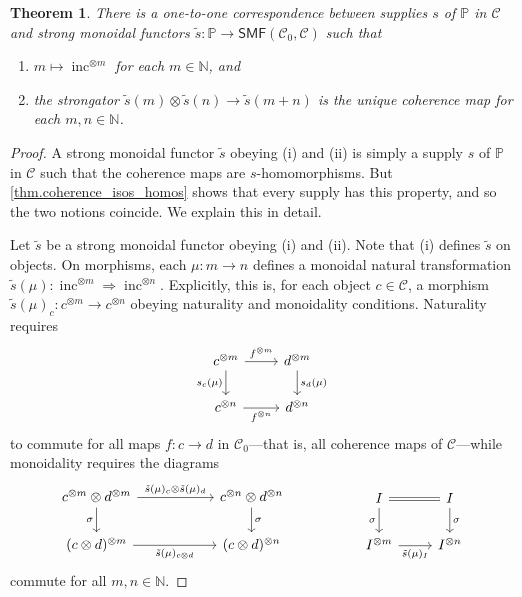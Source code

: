 \documentclass[11pt, oneside, article]{memoir}
\theoremstyle{plain}
\newtheorem{theorem}{Theorem}[chapter]
\theoremstyle{definition}
\theoremstyle{remark}
\newcommand{\cat}[1]{\mathcal{#1}}%
\newcommand{\Cat}[1]{{\mathsf{#1}}}%
\DeclareMathOperator{\inc}{inc}
\newcommand{\tpow}[1]{^{\otimes #1}}
\newcommand{\smf}{\Cat{SMF}}
\newcommand{\nn}{\mathbb{N}}
\newcommand{\pp}{\mathbb{P}}
\newcommand{\mob}[1]{#1_0}
\begin{document}
\begin{theorem}\label{thm.supply_v2}
There is a one-to-one correspondence between supplies $s$ of $\pp$ in $\cat{C}$ and strong monoidal functors $\tilde{s}\colon\pp\to\smf(\mob{\cat{C}},\cat{C})$ such that 
\begin{enumerate}[label=(\roman*)]
	\item $m\mapsto\inc\tpow{m}$ for each $m\in\nn$, and
	\item the strongator $\tilde{s}(m)\otimes \tilde{s}(n)\to \tilde{s}(m+n)$ is the unique coherence map for each $m,n \in \nn$.
\end{enumerate}
\end{theorem}\begin{proof}
A strong monoidal functor $\tilde{s}$ obeying (i) and (ii) is simply a supply $s$ of $\pp$ in $\cat{C}$ such that the coherence maps are $s$-homomorphisms. But \cref{thm.coherence_isos_homos} shows that every supply has this property, and so the two notions coincide. We explain this in detail.

Let $\tilde{s}$ be a strong monoidal functor obeying (i) and (ii). Note that (i) defines $\tilde{s}$ on objects. On morphisms, each $\mu\colon m \to n$ defines a monoidal natural transformation $\tilde{s}(\mu)\colon \inc\tpow{m} \Rightarrow \inc\tpow{n}$. Explicitly, this is, for each object $c \in \cat{C}$, a morphism $\tilde{s}(\mu)_c \colon c\tpow{m} \to c \tpow{n}$ obeying naturality and monoidality conditions. Naturality requires 
\begin{equation}\label{eqn.C_0_homos}
\begin{tikzcd}
	c\tpow{m}\ar[d, "s_c(\mu)"']\ar[r, "f\tpow{m}"]&
	d\tpow{m}\ar[d, "s_d(\mu)"]\\
	c\tpow{n}\ar[r, "f\tpow{n}"']&
	d\tpow{n}
\end{tikzcd}
\end{equation}
to commute for all maps $f\colon c \to d$ in $\mob{\cat{C}}$---that is, all coherence maps of $\cat{C}$---while monoidality requires the diagrams
\begin{equation}\label{eqn.supply_commute_tensors_v2}
\begin{tikzcd}[column sep=55pt]
	c\tpow{m}\otimes d\tpow{m}\ar[r, "\tilde{s}(\mu)_c\otimes \tilde{s}(\mu)_d"]\ar[d, "\sigma"']&
	c\tpow{n}\otimes d\tpow{n}\ar[d, "\sigma"]\\
	(c\otimes d)\tpow{m}\ar[r, "\tilde{s}(\mu)_{c\otimes d}"']&
	(c\otimes d)\tpow{n}
\end{tikzcd}
\hspace{.7in}
\begin{tikzcd}
	I\ar[r, equal]\ar[d, "\sigma"']&
	I\ar[d, "\sigma"]\\
	I\tpow{m}\ar[r, "\tilde{s}(\mu)_I"']&
	I\tpow{n}
\end{tikzcd}
\end{equation}
commute for all $m,n \in \nn$.


\end{proof}
\end{document}
